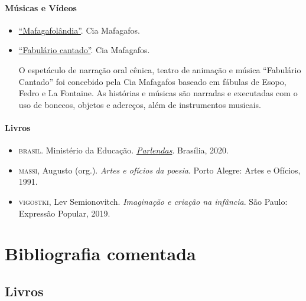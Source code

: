 \documentclass[11pt]{extarticle}
\begin{document}
\paragraph{Músicas e Vídeos}

\begin{itemize}
\item \href{https://www.youtube.com/watch?v=MYZm-aR2IJU}{``Mafagafolândia''}. Cia Mafagafos. 


\item \href{https://www.youtube.com/watch?v=0tWcd7Xvbbs}{``Fabulário cantado''}. Cia Mafagafos. 

O espetáculo de narração oral cênica, teatro de animação e música ``Fabulário Cantado'' foi concebido pela Cia Mafagafos baseado em fábulas de Esopo, Fedro e La Fontaine.  As histórias e músicas são narradas e executadas com o uso de bonecos, objetos e adereços, além de instrumentos musicais. 


\end{itemize}


\paragraph{Livros}

\begin{itemize}
	
\item \textsc{brasil}. Ministério da Educação. \href{http://alfabetizacao.mec.gov.br/images/conta-pra-mim/livros/versao_digital/parlendas_versao_digital.pdf}{\textit{Parlendas}}. Brasília, 2020. 

\item \textsc{massi}, Augusto (org.). \emph{Artes e ofícios da poesia}. Porto Alegre:
  Artes e Ofícios, 1991.

\item \textsc{vigostki}, Lev Semionovitch. \textit{Imaginação e criação na infância}. São Paulo: Expressão Popular, 2019.
\end{itemize}

\section{Bibliografia comentada}

\subsection{Livros}
\end{document}
